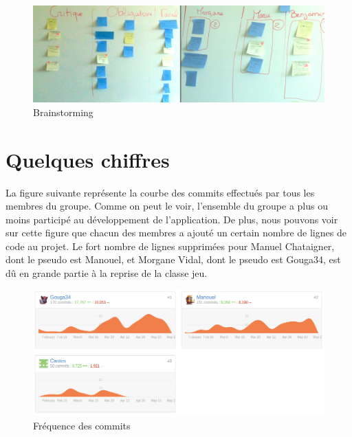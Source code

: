 \documentclass{report}
\begin{document}
\begin{figure}[H]
\begin{center}
\includegraphics[scale=0.1]{./brainstorming.jpg}
\caption{Brainstorming}
\end{center}
\end{figure}

\section{Quelques chiffres}
\hspace{0.5cm}La figure suivante représente la courbe des commits effectués par tous les membres du groupe. Comme on peut le voir, l'ensemble du groupe a plus ou moins participé au développement de l'application. De plus, nous pouvons voir sur cette figure que chacun des membres a ajouté un certain nombre de lignes de code au projet. Le fort nombre de lignes supprimées pour Manuel Chataigner, dont le pseudo est Manouel, et Morgane Vidal, dont le pseudo est Gouga34, est dû en grande partie à la reprise de la classe jeu.\par

\begin{figure}[H]
\begin{center}
	\includegraphics[scale=0.4]{./courbesCommits.png}
	\caption{Fréquence des commits}
\end{center}
\end{figure}




\end{document}
